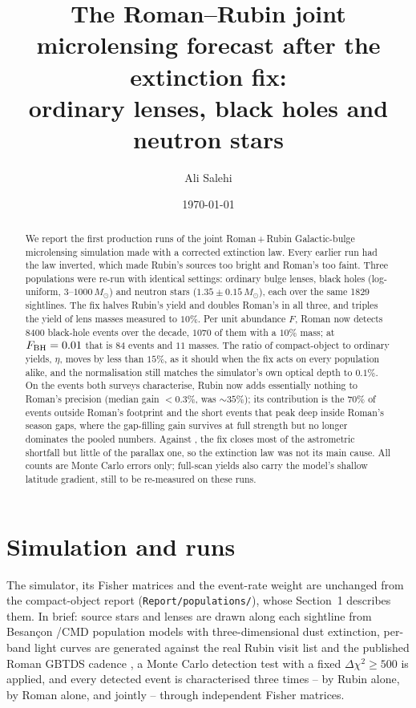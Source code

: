 \documentclass[english,10pt,a4paper]{article}
\title{The Roman--Rubin joint microlensing forecast after the extinction fix:\\
       ordinary lenses, black holes and neutron stars}
\author{Ali Salehi}
\date{\today}
\newcommand{\Msun}{M_\odot}
\begin{document}
\maketitle

\begin{abstract}
We report the first production runs of the joint Roman\,+\,Rubin Galactic-bulge microlensing
simulation made with a corrected \citet{Cardelli1989} extinction law. Every earlier run had the law
inverted, which made Rubin's sources too bright and Roman's too faint. Three populations were
re-run with identical settings: ordinary bulge lenses, black holes (log-uniform, $3$--$1000\,\Msun$)
and neutron stars ($1.35\pm0.15\,\Msun$), each over the same 1829 sightlines. The fix halves
Rubin's yield and doubles Roman's in all three, and triples the yield of lens masses measured to
$10\%$. Per unit abundance $F$, Roman now detects $8400$ black-hole events over the decade, $1070$
of them with a $10\%$ mass; at $F_{\rm BH}=0.01$ that is $84$ events and $11$ masses. The ratio of
compact-object to ordinary yields, $\eta$, moves by less than $15\%$, as it should when the fix acts
on every population alike, and the normalisation still matches the simulator's own optical depth to
$0.1\%$. On the events both surveys characterise, Rubin now adds essentially nothing to Roman's
precision (median gain $<0.3\%$, was $\sim\!35\%$); its contribution is the $70\%$ of events outside
Roman's footprint and the short events that peak deep inside Roman's season gaps, where the
gap-filling gain survives at full strength but no longer dominates the pooled numbers. Against
\citet{SajadianSahu2023}, the fix closes most of the astrometric shortfall but little of the
parallax one, so the extinction law was not its main cause. All counts are Monte Carlo errors only;
full-scan yields also carry the model's shallow latitude gradient, still to be re-measured on these
runs.
\end{abstract}

\section{Simulation and runs}

The simulator, its Fisher matrices and the event-rate weight are unchanged from the compact-object
report (\texttt{Report/populations/}), whose Section~1 describes them. In brief: source stars and
lenses are drawn along each sightline from Besan\c{c}on \citep{Robin2003}/CMD population models
with three-dimensional dust extinction, per-band light curves are generated against the real Rubin
visit list and the published Roman GBTDS cadence \citep{ROTAC2025}, a Monte Carlo detection test
with a fixed $\Delta\chi^2\ge500$ is applied, and every detected event is characterised three
times -- by Rubin alone, by Roman alone, and jointly -- through independent Fisher matrices.
\end{document}
